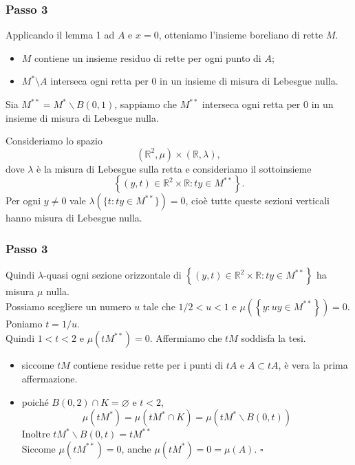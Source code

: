 \documentclass[11pt]{beamer} %
\newcommand{\<}{\langle}
\renewcommand{\>}{\rangle}
\theoremstyle{theorem}
\theoremstyle{theorem}
\theoremstyle{theorem}
\theoremstyle{theorem}
\theoremstyle{theorem}
\begin{document}
\begin{frame}
\frametitle{Passo 3}
Applicando il lemma 1 ad $A$ e $x=0$, otteniamo l'insieme boreliano di rette $M$. \pause \\
\begin{itemize}
	\item $M$ contiene un insieme residuo di rette per ogni punto di $A$;\\
	\item $M^*\setminus A$ interseca ogni retta per $0$ in un insieme di misura di Lebesgue nulla.
\end{itemize} \pause
Sia $M^{* *}=M^{*} \backslash B(0,1)$, sappiamo che $M^{**}$ interseca ogni retta per $0$ in un insieme di misura di Lebesgue nulla.\\ \pause

Consideriamo lo spazio
$$\left(\mathbb{R}^{2}, \mu\right) \times(\mathbb{R}, \lambda),	$$
dove $\lambda$ è la misura di Lebesgue sulla retta e consideriamo il sottoinsieme 
$$	\left\{(y, t) \in \mathbb{R}^{2} \times \mathbb{R}: t y \in M^{* *}\right\} .$$
\pause
Per ogni $y \neq 0$ vale $\lambda(\{t: ty \in M^{**}\})=0$, cioè tutte queste sezioni verticali hanno misura di Lebesgue nulla.

\end{frame}

\begin{frame}
	\frametitle{Passo 3}
	Quindi $\lambda$-quasi ogni sezione orizzontale di
	$\left\{(y, t) \in \mathbb{R}^{2} \times \mathbb{R}: t y \in M^{* *}\right\} $
	ha misura $\mu$ nulla.\\
	Possiamo scegliere un numero $u$ tale che $1 / 2<u<1$ e $\mu\left(\left\{y: u y \in M^{* *}\right\}\right)=0$.\\ \pause
	Poniamo $t=1 / u$.\\ 
	Quindi $1<t<2$ e $\mu\left(t M^{* *}\right)=0$. Affermiamo che $t M$ soddisfa la tesi.\\ \pause
	\begin{itemize}
		\item siccome $t M$ contiene residue rette per i punti di $tA$ e $A \subset tA$, è vera la prima affermazione.\\ \pause
		\item poiché $B(0,2) \cap K=\varnothing$ e $t<2$,
		$$ \mu\left(t M^{*}\right)=\mu\left(t M^{*} \cap K\right)=\mu\left(t M^{*} \backslash B(0, t)\right) $$
		Inoltre	$ t M^{*} \backslash B(0, t)=t M^{* *} $\\ \pause
		Siccome $\mu\left(t M^{* *}\right)=0$, anche $\mu (tM^*)= 0= \mu(A)$. \hfill $\square$
	\end{itemize}
\end{frame}
\end{document}
